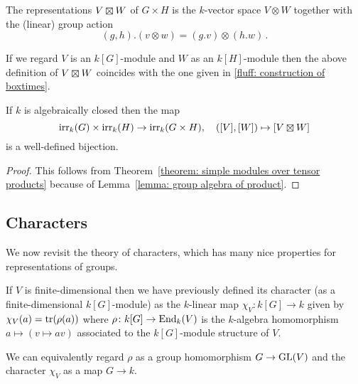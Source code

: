 \begin{definition}
  The representations $V \outertensor W$ of $G \times H$ is the $k$-vector space $V \otimes W$ together with the (linear) group action
  \[
      (g,h).(v \otimes w)
    = (g.v) \otimes (h.w) \,.
  \]
\end{definition}


\begin{remark}
  If we regard $V$ is an $k[G]$-module and $W$ as an $k[H]$-module then the above definition of $V \outertensor W$ coincides with the one given in \ref{fluff: construction of boxtimes}.
\end{remark}


\begin{corollary}
  \label{corollary: irr rep of products}
  If $k$ is algebraically closed then the map
  \[
            \irr_k(G) \times \irr_k(H)
    \to     \irr_k(G \times H),
    \quad   ([V],[W])
    \mapsto [V \mathbin{\outertensor} W]
  \]
  is a well-defined bijection.
\end{corollary}


\begin{proof}
  This follows from Theorem~\ref{theorem: simple modules over tensor products} because of Lemma~\ref{lemma: group algebra of product}.
\end{proof}





\subsection{Characters}


\begin{fluff}
  We now revisit the theory of characters, which has many nice properties for representations of groups.
  
  If $V$ is finite-dimensional then we have previously defined its character (as a finite-dimensional $k[G]$-module) as the $k$-linear map $\chi_V \colon k[G] \to k$ given by $\chi_V(a) = \operatorname{tr}(\rho(a))$ where $\rho \colon k[G] \to \operatorname{End}_k(V)$ is the $k$-algebra homomorphism $a \mapsto (v \mapsto av)$ associated to the $k[G]$-module structure of $V$.
  
  We can equivalently regard $\rho$ as a group homomorphism $G \to \operatorname{GL}(V)$ and the character $\chi_V$ as a map $G \to k$.
\end{fluff}


